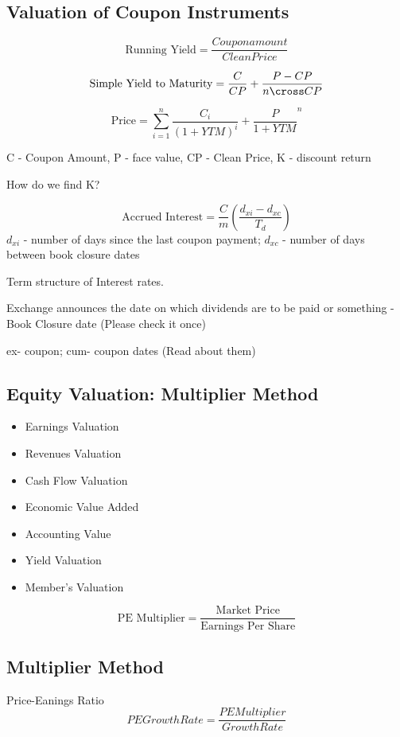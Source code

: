 \documentclass{article}
\begin{document}
\subsection{Valuation of Coupon Instruments}
\[\text{Running Yield} = \frac{Coupon amount}{Clean Price}\]

\[\text{Simple Yield to Maturity} = \frac{C}{CP} + \frac{P - CP}{n \cross CP}\]

\[\text{Price} = \sum_{i = 1}^{n} \frac{C_i}{(1 + YTM)^i} + \frac{P}{1 + YTM}^n\]

C - Coupon Amount, P - face value, CP - Clean Price, K - discount return

How do we find K? 

\[\text{Accrued Interest} = \frac{C}{m} \left(\frac{d_{xi} - d_{xc}}{T_d}\right)\]
$d_{xi}$ - number of days since the last coupon payment; 
$d_{xc}$ - number of days between book closure dates 

Term structure of Interest rates.

Exchange announces the date on which dividends are to be paid or something - Book Closure date (Please check it once)

ex- coupon; cum- coupon dates (Read about them)


\subsection{Equity Valuation: Multiplier Method}

\begin{itemize}
    \item Earnings Valuation
    \item Revenues Valuation
    \item Cash Flow Valuation
    \item Economic Value Added
    \item Accounting Value
    \item Yield Valuation
    \item Member's Valuation
\end{itemize}

\[\text{PE Multiplier} = \frac{\text{Market Price}}{\text{Earnings Per Share}}\]

\subsection{Multiplier Method}

Price-Eanings Ratio
\[PE Growth Rate = \frac{PE Multiplier}{Growth Rate}\]
\end{document}
